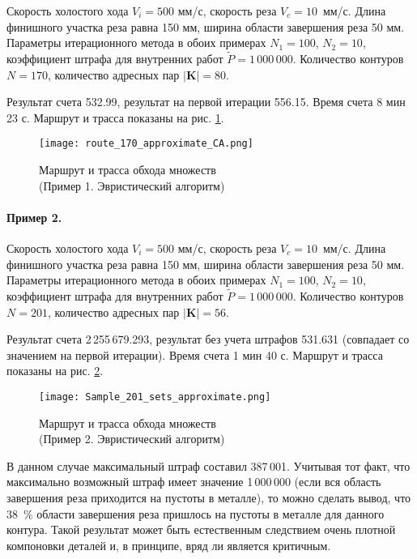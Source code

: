 Скорость холостого хода $V_i=500$ мм/с,
скорость реза $V_c=10$~мм/с.
Длина финишного участка реза равна 150 мм,
ширина области завершения реза 50 мм.
Параметры итерационного метода в обоих примерах
$N_1=100$, $N_2=10$,
коэффициент штрафа для внутренних работ
$\tilde{P}=1\,000\,000$.
Количество контуров $N=170$,
количество адресных пар $|\mathbf{K}|=80$.

Результат счета 532.99,
результат на первой итерации 556.15.
Время счета 8 мин 23 с.
Маршрут и трасса показаны на рис. \ref{Sample1Heuristic}.

\begin{figure}[h]
  \begin{center}
  \texttt{[image: route\_170\_approximate\_CA.png]}
  \caption{
    Маршрут и трасса обхода множеств \\
    (Пример 1. Эвристический алгоритм)
    }
  \label{Sample1Heuristic}
  \end{center}
\end{figure}

\paragraph*{Пример 2.}

Скорость холостого хода $V_i=500$ мм/с,
скорость реза $V_c=10$~мм/с.
Длина финишного участка реза равна 150 мм,
ширина области завершения реза 50 мм.
Параметры итерационного метода в обоих примерах
$N_1=100$, $N_2=10$,
коэффициент штрафа для внутренних работ
$\tilde{P}=1\,000\,000$.
Количество контуров $N=201$,
количество адресных пар $|\mathbf{K}|=56$.

Результат счета 2\,255\,679.293,
результат без учета штрафов 531.631
(совпадает со значением на первой итерации).
Время счета 1 мин 40 с.
Маршрут и трасса показаны на рис. \ref{Sample2Heuristic}.

\begin{figure}[h]
  \begin{center}
  \texttt{[image: Sample\_201\_sets\_approximate.png]}
  \caption{
    Маршрут и трасса обхода множеств\\
    (Пример 2. Эвристический алгоритм)
    }
  \label{Sample2Heuristic}
  \end{center}
\end{figure}

В данном случае максимальный штраф составил 387\,001.
Учитывая тот факт, что максимально возможный штраф имеет значение 1\,000\,000
(если вся область завершения реза приходится на пустоты в металле),
то можно сделать вывод, что 38~\% области
завершения реза пришлось на пустоты в металле для данного контура.
Такой результат может быть естественным следствием очень плотной компоновки деталей
и, в принципе, вряд ли является критичным.

